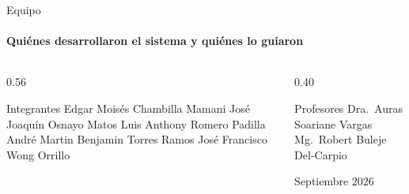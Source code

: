 \documentclass[aspectratio=169,11pt]{beamer}
\begin{document}
\begin{frame}{Equipo}
  \framesubtitle{Quiénes desarrollaron el sistema y quiénes lo guiaron}
  \begin{columns}[T]
    \begin{column}{0.56\textwidth}
      \begin{block}{Integrantes}
        \small
        Edgar Moisés Chambilla Mamani\newline
        José Joaquín Osnayo Matos\newline
        Luis Anthony Romero Padilla\newline
        André Martin Benjamin Torres Ramos\newline
        José Francisco Wong Orrillo
      \end{block}
    \end{column}
    \begin{column}{0.40\textwidth}
      \begin{block}{Profesores}
        \small
        Dra.\ Auras Soariane Vargas\newline
        Mg.\ Robert Buleje Del-Carpio
      \end{block}
      \vfill
      \centering\color{slate}Septiembre 2026\par
    \end{column}
  \end{columns}
\end{frame}
\end{document}
